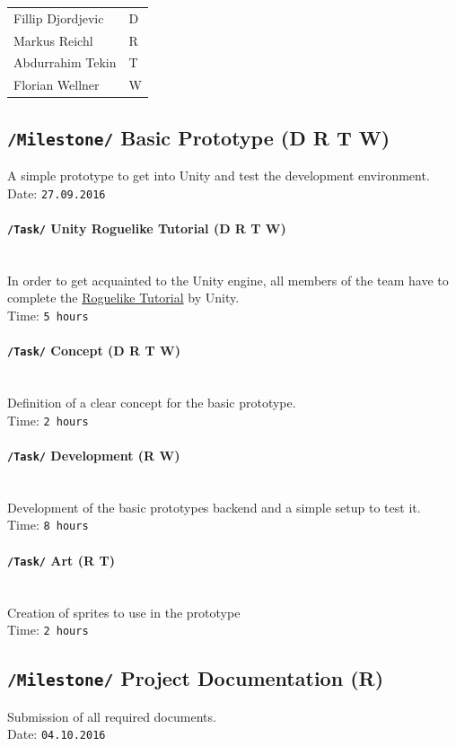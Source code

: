 \documentclass[11pt]{article}
\begin{document}
\begin{tabular}{l l}
 Fillip Djordjevic & D\\
 Markus Reichl & R\\
 Abdurrahim Tekin & T\\
 Florian Wellner & W
\end{tabular}

\subsection{\texttt{/Milestone/} Basic Prototype \small{(D R T W)}}
A simple prototype to get into Unity and test the development environment.
\\ Date: \texttt{27.09.2016}
\paragraph{\texttt{/Task/} Unity Roguelike Tutorial \small{(D R T W)}}~\\
In order to get acquainted to the Unity engine, all members of the team have to complete the \href{https://unity3d.com/learn/tutorials/projects/2d-roguelike-tutorial}{Roguelike Tutorial} by Unity.
\\ Time: \texttt{5 hours}
\paragraph{\texttt{/Task/} Concept \small{(D R T W)}}~\\
Definition of a clear concept for the basic prototype.
\\ Time: \texttt{2 hours}
\paragraph{\texttt{/Task/} Development \small{(R W)}}~\\
Development of the basic prototypes backend and a simple setup to test it.
\\ Time: \texttt{8 hours}
\paragraph{\texttt{/Task/} Art \small{(R T)}}~\\
Creation of sprites to use in the prototype
\\ Time: \texttt{2 hours}

\subsection{\texttt{/Milestone/} Project Documentation \small{(R)}}
Submission of all required documents.
\\ Date: \texttt{04.10.2016}
\end{document}
